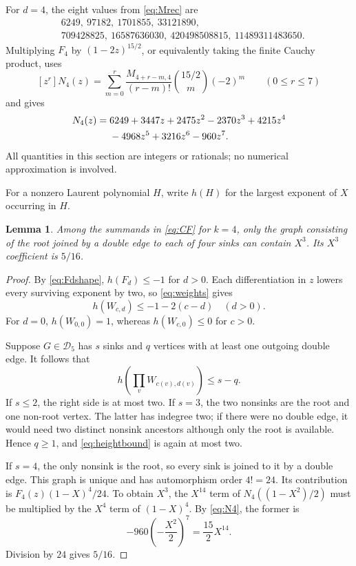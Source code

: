 \documentclass[11pt]{amsart}
\newtheorem{lemma}[theorem]{Lemma}
\theoremstyle{definition}
\newcommand{\D}{\mathcal D}
\begin{document}
For $d=4$, the eight values from \eqref{eq:Mrec} are
\begin{align*}
&6249,\ 97182,\ 1701855,\ 33121890,\\
&709428825,\ 16587636030,\ 420498508815,\ 11489311483650.
\end{align*}
Multiplying $F_4$ by $(1-2z)^{15/2}$, or equivalently taking the finite
Cauchy product, uses
\[
 [z^r]N_4(z)=\sum_{m=0}^r\frac{M_{4+r-m,4}}{(r-m)!}
 \binom{15/2}{m}(-2)^m\qquad(0\le r\le7)
\]
and gives
\begin{align}\label{eq:N4}
N_4(z)={}&6249+3447z+2475z^2-2370z^3+4215z^4\notag\\
&-4968z^5+3216z^6-960z^7.
\end{align}
All quantities in this section are integers or rationals; no numerical
approximation is involved.

For a nonzero Laurent polynomial $H$, write $h(H)$ for the largest exponent
of $X$ occurring in $H$.

\begin{lemma}\label{lem:highest}
Among the summands in \eqref{eq:CF} for $k=4$, only the graph consisting of
the root joined by a double edge to each of four sinks can contain $X^3$.
Its $X^3$ coefficient is $5/16$.
\end{lemma}

\begin{proof}
By \eqref{eq:Fdshape}, $h(F_d)\le-1$ for $d>0$.  Each differentiation in $z$
lowers every surviving exponent by two, so \eqref{eq:weights} gives
\[
 h(W_{c,d})\le-1-2(c-d)\quad(d>0).
\]
For $d=0$, $h(W_{0,0})=1$, whereas $h(W_{c,0})\le0$ for $c>0$.

Suppose $G\in\D_5$ has $s$ sinks and $q$ vertices with at least one outgoing
double edge.  It follows that
\begin{equation}\label{eq:heightbound}
 h\left(\prod_vW_{c(v),d(v)}\right)\le s-q.
\end{equation}
If $s\le2$, the right side is at most two.  If $s=3$, the two nonsinks are
the root and one non-root vertex.  The latter has indegree two; if there were
no double edge, it would need two distinct nonsink ancestors although only the
root is available.  Hence $q\ge1$, and \eqref{eq:heightbound} is again at most
two.

If $s=4$, the only nonsink is the root, so every sink is joined to it by a
double edge.  This graph is unique and has automorphism order $4!=24$.  Its
contribution is $F_4(z)(1-X)^4/24$.  To obtain $X^3$, the $X^{14}$ term of
$N_4((1-X^2)/2)$ must be multiplied by the $X^4$ term of $(1-X)^4$.  By
\eqref{eq:N4}, the former is
\[
 -960\left(-\frac{X^2}{2}\right)^7=\frac{15}{2}X^{14}.
\]
Division by $24$ gives $5/16$.
\end{proof}
\end{document}
